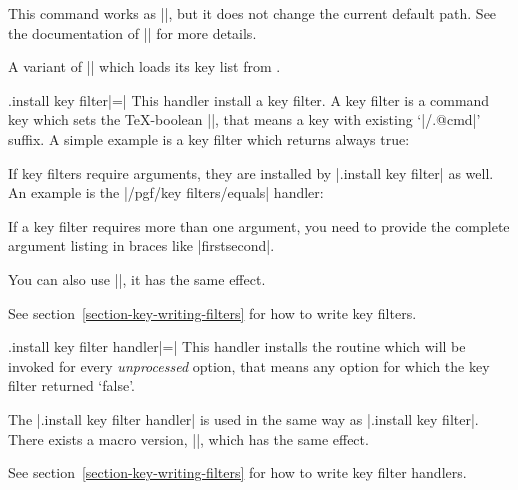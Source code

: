\begin{command}{\pgfkeysalsofiltered{}}
	This command works as |\pgfkeysfiltered|, but it does not change the current default path. See the documentation of |\pgfkeysalso| for more details.
\end{command}

\begin{command}{\pgfkeysalsofilteredfrom{}}
	A variant of |\pgfkeysalsofiltered| which loads its key list from .
\end{command}

\begin{handler}{{.install key filter}|=|}
	This handler install a key filter. A key filter is a command key which sets the \TeX-boolean |\ifpgfkeysfiltercontinue|, that means a key with existing `|/.@cmd|' suffix. A simple example is a key filter which returns always true:
\begin{codeexample}
\end{codeexample}
	If key filters require arguments, they are installed by |.install key filter| as well. An example is the |/pgf/key filters/equals| handler:
\begin{codeexample}[]
\end{codeexample}
	If a key filter requires more than one argument, you need to provide the complete argument listing in braces like |{{first}{second}}|.

	You can also use |\pgfkeysinstallkeyfilter|, it has the same effect.

	See section~\ref{section-key-writing-filters} for how to write key filters.
\end{handler}

\begin{handler}{{.install key filter handler}|=|}
	This handler installs the routine which will be invoked for every \emph{unprocessed} option, that means any option for which the key filter returned `false'. 

	The |.install key filter handler| is used in the same way as |.install key filter|. There exists a macro version, |\pgfkeysinstallkeyfilterhandler|, which has the same effect.

	See section~\ref{section-key-writing-filters} for how to write key filter handlers.
\end{handler}

